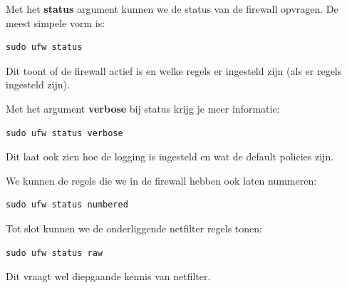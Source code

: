 Met het \textbf{status} argument kunnen we de status van de firewall opvragen. De meest simpele vorm is:
\begin{lstlisting}
sudo ufw status
\end{lstlisting}
Dit toont of de firewall actief is en welke regels er ingesteld zijn (als er regels ingesteld zijn).

Met het argument \textbf{verbose} bij status krijg je meer informatie:
\begin{lstlisting}
sudo ufw status verbose
\end{lstlisting}
Dit laat ook zien hoe de logging is ingesteld en wat de default policies zijn.

We kunnen de regels die we in de firewall hebben ook laten nummeren:
\begin{lstlisting}
sudo ufw status numbered
\end{lstlisting}

Tot slot kunnen we de onderliggende netfilter regels tonen:
\begin{lstlisting}
sudo ufw status raw
\end{lstlisting}
Dit vraagt wel diepgaande kennis van netfilter.

